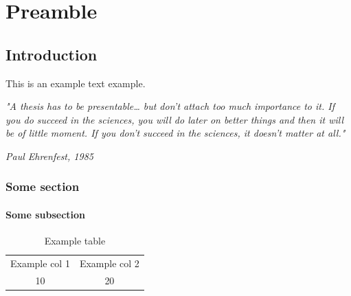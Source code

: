 \documentclass[12pt, a4paper, unicode]{report}
\renewcommand{\epigraphflush}{flushleft}
\begin{document}
\renewcommand\thechapter{\arabic{chapter}}

\epigraphhead{} %
\part*{Preamble}

    
    \chapter{Introduction}
    This is an example text \cite{preamble}{example}. 
    \lipsum[1]
    
    \begingroup
    \setlength{\epigraphwidth}{13.0cm}
    \renewcommand{\epigraphflush}{flushright}
    \vspace{0.3cm}
    \epigraph{\justifying\large\textit{"A thesis has to be presentable… but don't attach too much importance to it. If you do succeed in the sciences, you will do later on better things and then it will be of little moment. If you don’t succeed in the sciences, it doesn’t matter at all."}}{\textit{Paul Ehrenfest, 1985}}
    \vspace{0.3cm}
    \endgroup
    
    \section{Some section}
    \lipsum[1]
    \subsection{Some subsection}
    \lipsum[1]
    
    \begin{table}[ht]
        \centering
        \begin{tabular}{|c|c|}
        \hline
           Example col 1  &  Example col 2  \\
           10             &  20             \\
          \hline
        \end{tabular}
        \caption{Example table}
        \label{tab:exampleTab}
    \end{table}
    
\end{document}
